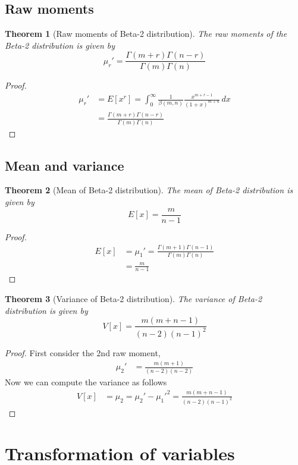 \documentclass[oneside,11pt,pdftex]{book}%
\numberwithin{equation}{section}
\newtheorem{theorem}{Theorem}[chapter]%
\numberwithin{section}{chapter}
\numberwithin{equation}{chapter}
\begin{document}
\subsection{Raw moments}
\begin{theorem}[Raw moments of Beta-2 distribution]
	The raw moments of the Beta-2 distribution is given by \[ \mu_r'= \frac{\Gamma(m+r)\Gamma(n-r)}{\Gamma(m)\Gamma(n)} \]
\end{theorem}
\begin{proof}
	\begin{align*}
		\mu_r'&=E[x^r]=\int_0^{\infty} \frac{1}{\beta(m,n)}\frac{x^{m+r-1}}{(1+x)^{m+n}}\, dx\\
		&=\frac{\Gamma(m+r)\Gamma(n-r)}{\Gamma(m)\Gamma(n)}
	\end{align*}
\end{proof}

\subsection{Mean and variance}
\begin{theorem}[Mean of Beta-2 distribution]
	The mean of Beta-2 distribution is given by \[ E[x]=\frac{m}{n-1} \]
\end{theorem}
\begin{proof}
	\begin{align*}
		E[x]&=\mu_1'=\frac{\Gamma(m+1)\Gamma(n-1)}{\Gamma(m)\Gamma(n)}\\
		&=\frac{m}{n-1}
	\end{align*}
\end{proof}

\begin{theorem}[Variance of Beta-2 distribution]
	The variance of Beta-2 distribution is given by \[ V[x]=\frac{m(m+n-1)}{(n-2)(n-1)^2} \]
\end{theorem}
\begin{proof}
	First consider the 2nd raw moment,
	\begin{align*}
		\mu_2'&=\frac{m(m+1)}{(n-2)(n-2)}
	\end{align*}
	Now we can compute the variance as follows
	\begin{align*}
		V[x]&=\mu_2=\mu_2'-\mu_1'^2=\frac{m(m+n-1)}{(n-2)(n-1)^2}
	\end{align*}
\end{proof}

\section{Transformation of variables}
\end{document}
